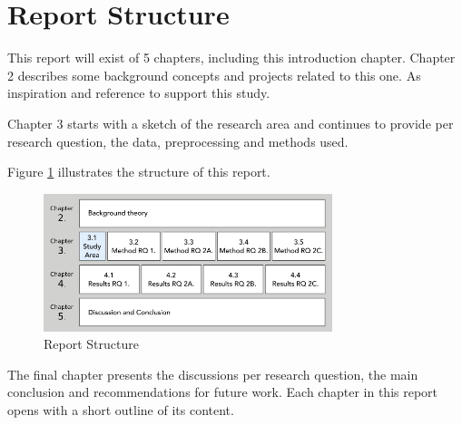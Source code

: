 \section{Report Structure}
This report will exist of 5 chapters, including this introduction chapter. Chapter 2 describes some background concepts and projects related to this one. As inspiration and reference to support this study.

Chapter 3 starts with a sketch of the research area and continues to provide per research question, the data, preprocessing and methods used.

Figure \ref{reportstruct} illustrates the structure of this report. 

\begin{figure}[h]
\includegraphics[width=0.75\textwidth]{img/I_reportstructure.png}
\centering
\caption{Report Structure}\label{reportstruct}
\end{figure}

The final chapter presents the discussions per research question, the main conclusion and recommendations for future work.
Each chapter in this report opens with a short outline of its content.